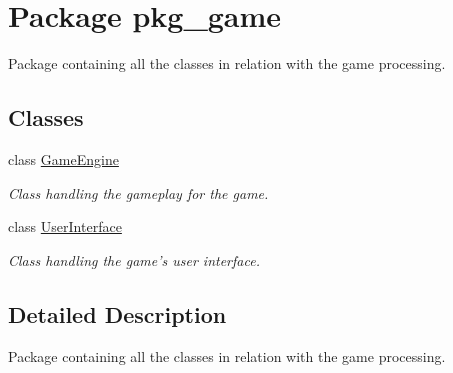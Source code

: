 \hypertarget{namespacepkg__game}{\section{Package pkg\-\_\-game}
\label{namespacepkg__game}
}


Package containing all the classes in relation with the game processing.  


\subsection*{Classes}
\begin{DoxyCompactItemize}
\item 
class \hyperlink{classpkg__game_1_1GameEngine}{Game\-Engine}
\begin{DoxyCompactList}\small\item\em Class handling the gameplay for the game. \end{DoxyCompactList}\item 
class \hyperlink{classpkg__game_1_1UserInterface}{User\-Interface}
\begin{DoxyCompactList}\small\item\em Class handling the game's user interface. \end{DoxyCompactList}\end{DoxyCompactItemize}


\subsection{Detailed Description}
Package containing all the classes in relation with the game processing. 